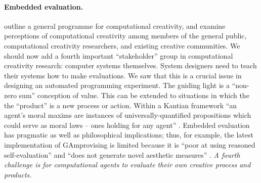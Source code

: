 \paragraph{\textbf{Embedded evaluation}.}   outline a general programme
  for computational creativity, and examine perceptions of
  computational creativity among members of the general public,
  computational creativity researchers, and existing creative
  communities.  We should now add a fourth important ``stakeholder''
  group in computational creativity research: computer systems
  themselves.  System designers need to teach their systems how to
  make evaluations.  We saw that this is a crucial issue in designing
  an automated programming experiment.  The guiding light is a
  ``non-zero sum'' conception of value.  This can be extended to
  situations in which the the ``product'' is a new process or action.
  Within a Kantian framework ``an agent's moral maxims are instances
  of universally-quantified propositions which could serve as moral
  laws -- ones holding for any agent'' \cite{powers2005deontological}.
  Embedded evaluation has pragmatic as well as philosophical
  implications; thus, for example, the latest implementation of {\sf
    GAmprovising} is limited because it is ``poor at using reasoned
  self-evaluation'' and ``does not generate novel aesthetic measures''
  \cite[pp.~189, 288]{jordanous2012evaluating}.  \emph{A fourth
    challenge is for computational agents to evaluate their own
    creative process and products.}

